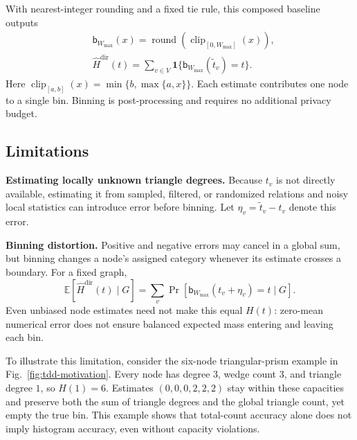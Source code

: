With nearest-integer rounding and a fixed tie rule, this composed baseline outputs
\begin{equation}
\begin{aligned}
&\mathsf b_{W_{\max}}(x)=\operatorname{round}(\operatorname{clip}_{[0,W_{\max}]}(x)),\\
&\widehat H^{\mathrm{dir}}(t)=\sum_{v\in V}\mathbf1\{\mathsf b_{W_{\max}}(\widetilde t_v)=t\}.
\end{aligned}
\label{eq:direct-gdd}
\end{equation}
Here $\operatorname{clip}_{[a,b]}(x)=\min\{b,\max\{a,x\}\}$.
Each estimate contributes one node to a single bin. 
Binning is post-processing and requires no additional privacy budget.

\subsection{Limitations}
\label{subsec:direct-limitations}

\noindent\textbf{Estimating locally unknown triangle degrees.}
Because $t_v$ is not directly available, estimating it from sampled, filtered, or randomized relations and noisy local statistics can introduce error before binning. Let $\eta_v=\widetilde t_v-t_v$ denote this error.

\noindent\textbf{Binning distortion.}
Positive and negative errors may cancel in a global sum, but binning changes a node's assigned category whenever its estimate crosses a boundary. 
For a fixed graph,
\begin{equation}
\mathbb E[\widehat H^{\mathrm{dir}}(t)\mid G]
=\sum_v\Pr[\mathsf b_{W_{\max}}(t_v+\eta_v)=t\mid G].
\label{eq:expected-direct-gdd}
\end{equation}
Even unbiased node estimates need not make this equal $H(t)$: zero-mean numerical error does not ensure balanced expected mass entering and leaving each bin.


To illustrate this limitation,
consider the six-node triangular-prism example in Fig.~\ref{fig:tdd-motivation}. Every node has degree $3$, wedge count $3$, and triangle degree $1$, so $H(1)=6$. Estimates $(0,0,0,2,2,2)$ stay within these capacities and preserve both the sum of triangle degrees and the global triangle count, yet empty the true bin. This example shows that total-count accuracy alone does not imply histogram accuracy, even without capacity violations.

